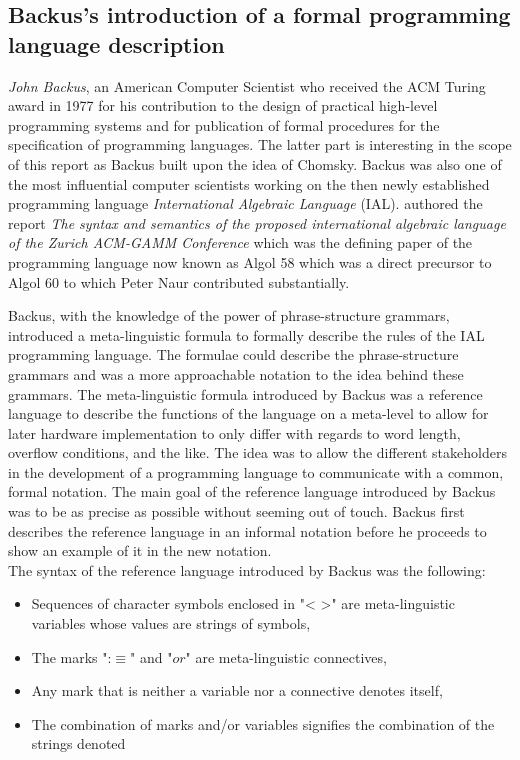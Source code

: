 \documentclass{article}
\begin{document}
\subsection{Backus's introduction of a formal programming language description}
\textit{John Backus}, an American Computer Scientist who received the ACM Turing award in 1977 for his contribution to the design of practical high-level programming systems and for publication of formal procedures for the specification of programming languages. The latter part is interesting in the scope of this report as Backus built upon the idea of Chomsky. Backus was also one of the most influential computer scientists working on the then newly established programming language \textit{International Algebraic Language} (IAL). \citet{Backus1959TheSA} authored the report \textit{The syntax and semantics of the proposed international algebraic language of the Zurich ACM-GAMM Conference} which was the defining paper of the programming language now known as Algol 58 which was a direct precursor to Algol 60 to which Peter Naur contributed substantially.

Backus, with the knowledge of the power of phrase-structure grammars, introduced a meta-linguistic formula to formally describe the rules of the IAL programming language. The formulae could describe the phrase-structure grammars and was a more approachable notation to the idea behind these grammars. The meta-linguistic formula introduced by Backus was a reference language to describe the functions of the language on a meta-level to allow for later hardware implementation to only differ with regards to word length, overflow conditions, and the like. The idea was to allow the different stakeholders in the development of a programming language to communicate with a common, formal notation. The main goal of the reference language introduced by Backus was to be as precise as possible without seeming out of touch. Backus first describes the reference language in an informal notation before he proceeds to show an example of it in the new notation.
\\
The syntax of the reference language introduced by Backus was the following:
\begin{itemize}
	\item Sequences of character symbols enclosed in "< >" are meta-linguistic variables whose values are strings of symbols,
	\item The marks ":$\equiv$" and "$or$" are meta-linguistic connectives,
	\item Any mark that is neither a variable nor a connective denotes itself,
	\item The combination of marks and/or variables signifies the combination of the strings denoted
\end{itemize} 
\end{document}
